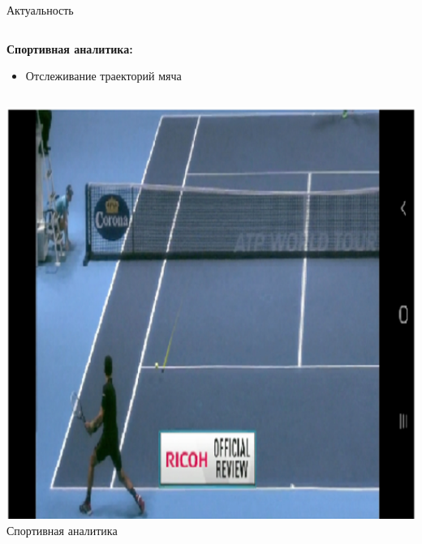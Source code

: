 \documentclass{beamer} %
\begin{document}
\begin{frame}{Актуальность}
  \begin{columns}[T]
    \begin{column}{\textwidth}
      \textbf{Спортивная аналитика:}
      \begin{itemize}
        \item Отслеживание траекторий мяча
      \end{itemize}
    \end{column}
  \end{columns}
  \vspace{0.5cm}
  \begin{columns}
    \begin{column}{0.5\textwidth}
      \centering
      \includegraphics[width=\linewidth]{review/ball_track.png}
      \small Спортивная аналитика
    \end{column}
  \end{columns}
\end{frame}
\end{document}
